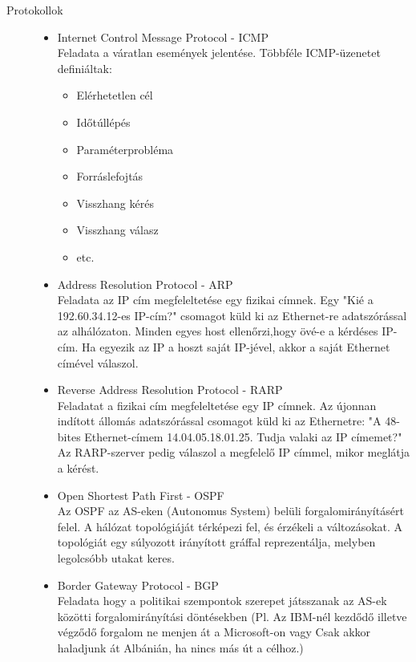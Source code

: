 \documentclass[margin=0px]{article}
\begin{document}
\begin{description}
\begin{itemize}
								
					\end{itemize}
			\item[Protokollok] \hfill
			\begin{itemize}
				\item Internet Control Message Protocol - ICMP \\
					Feladata a váratlan események jelentése. Többféle ICMP-üzenetet definiáltak:
					\begin{itemize}
						\item Elérhetetlen cél
						\item Időtúllépés
						\item Paraméterprobléma
						\item Forráslefojtás
						\item Visszhang kérés
						\item Visszhang válasz
						\item etc.
					\end{itemize}
				\item Address Resolution Protocol - ARP \\
					Feladata az IP cím megfeleltetése egy fizikai címnek. Egy "Kié a 192.60.34.12-es IP-cím?" csomagot küld ki az Ethernet-re adatszórással az alhálózaton. Minden egyes host ellenőrzi,hogy övé-e a kérdéses IP-cím. Ha egyezik az IP a hoszt saját IP-jével, akkor a saját Ethernet címével válaszol.
				\item Reverse Address Resolution Protocol - RARP \\
					Feladatat a fizikai cím megfeleltetése egy IP címnek. Az újonnan indított állomás adatszórással csomagot küld ki az Ethernetre: "A 48-bites Ethernet-címem 14.04.05.18.01.25. Tudja valaki az IP címemet?" Az RARP-szerver pedig válaszol a megfelelő IP címmel, mikor meglátja a kérést.
				\item Open Shortest Path First - OSPF \\
					Az OSPF az AS-eken (Autonomus System) belüli forgalomirányításért felel. A hálózat topológiáját térképezi fel, és érzékeli a változásokat. A topológiát egy súlyozott irányított gráffal reprezentálja, melyben legolcsóbb utakat keres. 
				\item Border Gateway Protocol - BGP \\
					Feladata hogy a politikai szempontok szerepet játsszanak az AS-ek közötti forgalomirányítási döntésekben (Pl. Az IBM-nél kezdődő illetve végződő forgalom ne menjen át a Microsoft-on vagy Csak akkor haladjunk át Albánián, ha nincs más út a célhoz.)\\

\end{itemize}
\end{description}
\end{document}
